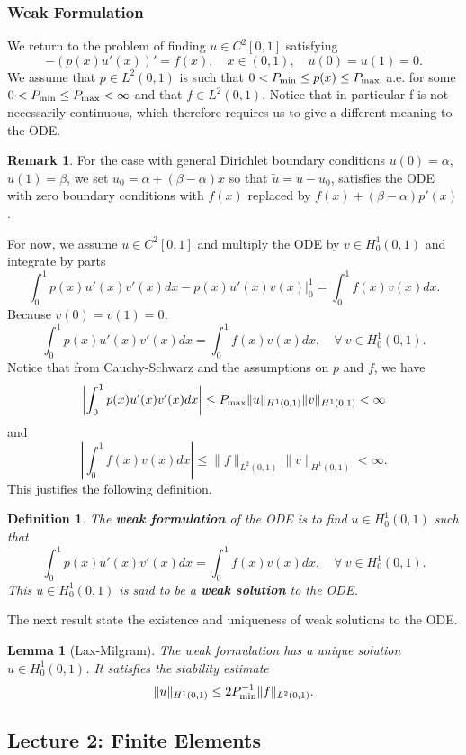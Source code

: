 \documentclass{article}
\newtheorem{lemma}[theorem]{Lemma}
\newtheorem{definition}[theorem]{Definition}
\theoremstyle{definition}
\theoremstyle{definition}
\newtheorem{remark}[theorem]{Remark}
\begin{document}
\subsubsection{Weak Formulation}
We return to the problem of finding $u\in C^2[0,1]$ satisfying
$$-(p(x)u'(x))'=f(x),\quad x\in (0,1),\quad u(0)=u(1)=0.$$
We assume that $p\in L^2(0,1)$ is such that $0<P_{\rm min}\leq p(x)\leq P_{\rm max}$ a.e. for some $0<P_{\rm min}\leq P_{\rm max}<\infty$ and that $f\in L^2(0,1)$. Notice that in particular f is not necessarily continuous, which therefore requires
us to give a different meaning to the ODE.
\begin{remark}
    For the case with general Dirichlet boundary conditions $u(0)=\alpha$, $u(1)=\beta$, we set $u_0=\alpha+(\beta-\alpha)x$ so that $\tilde{u}=u-u_0$, satisfies the ODE with zero boundary conditions with $f(x)$ replaced by $f(x)+(\beta-\alpha)p'(x)$.
\end{remark}
For now, we assume $u\in C^2[0,1]$ and multiply the ODE by $v\in H^1_0(0,1)$ and integrate by parts
$$\int_{0}^{1}p(x)u'(x)v'(x)dx-p(x)u'(x)v(x)\Bigg|_{0}^{1}=\int_{0}^{1}f(x)v(x)dx.$$
Because $v(0)=v(1)=0$,
$$\int_{0}^{1}p(x)u'(x)v'(x)dx=\int_{0}^{1}f(x)v(x)dx,\quad \forall\:v\in H^1_0(0,1).$$
Notice that from Cauchy-Schwarz and the assumptions on $p$ and $f$, we have
$$\left|\int_{0}^{1}p(x)u'(x)v'(x)dx\right|\leq P_{\rm max}\|u\|_{H^1(0,1)}\|v\|_{H^1(0,1)}<\infty$$
and
$$\left|\int_{0}^{1}f(x)v(x)dx\right|\leq \|f\|_{L^2(0,1)}\|v\|_{H^1(0,1)}<\infty.$$
This justifies the following definition.
\begin{definition}
    The \textbf{weak formulation} of the ODE is to find $u\in H^1_0(0,1)$ such that
    $$\int_{0}^{1}p(x)u'(x)v'(x)dx=\int_{0}^{1}f(x)v(x)dx,\quad \forall\:v\in H^1_0(0,1).$$
    This $u\in H^1_0(0,1)$ is said to be a \textbf{weak solution} to the ODE.
\end{definition}
The next result state the existence and uniqueness of weak solutions to the
ODE.
\begin{lemma}[Lax-Milgram]
    The weak formulation has a unique solution $u\in H^1_0(0,1)$. It satisfies the stability estimate
    $$\|u\|_{H^1(0,1)}\leq 2P^{-1}_{\rm min}\|f\|_{L^2(0,1)}.$$
\end{lemma}
\subsection{Lecture 2: Finite Elements}
\end{document}
